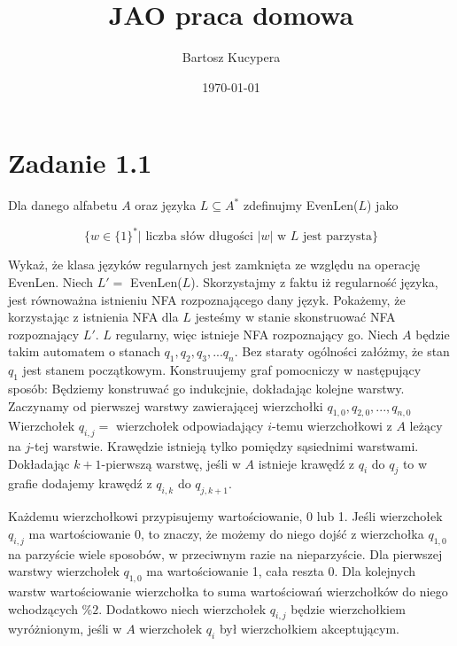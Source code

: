 \documentclass{article}
\title{JAO praca domowa}
\author{Bartosz Kucypera}
\date{\today}
\begin{document}
\maketitle

\section*{Zadanie 1.1}

Dla danego alfabetu $A$ oraz języka $L \subseteq A^*$ zdefinujmy EvenLen($L$) jako 

$$\{w \in \{1\}^* |\mbox{ liczba słów długości $|w|$ w $L$ jest parzysta} \}$$

Wykaż, że klasa języków regularnych jest zamknięta ze względu na operację EvenLen. \newline
\newline 
Niech $L' = $ EvenLen($L$).
Skorzystajmy z faktu iż regularność języka, jest równoważna istnieniu NFA rozpoznającego dany język. Pokażemy, że korzystając z istnienia NFA dla $L$ jesteśmy w stanie skonstruować NFA rozpoznający $L'$. \newline 
\newline 
$L$ regularny, więc istnieje NFA rozpoznający go. Niech $A$ będzie takim automatem o stanach $q_1, q_2, q_3, ... q_n$. Bez staraty ogólności załóżmy, że stan $q_1$ jest stanem początkowym. Konstruujemy graf pomocniczy w następujący sposób: \newline
Będziemy konstruwać go indukcjnie, dokładając kolejne warstwy.
Zaczynamy od pierwszej warstwy zawierającej wierzchołki $q_{1,0}, q_{2,0}, ..., q_{n,0}$
Wierzchołek $q_{i,j} = $ wierzchołek odpowiadający $i$-temu wierzchołkowi z $A$ leżący na $j$-tej warstwie. \newline 
Krawędzie istnieją tylko pomiędzy sąsiednimi warstwami. Dokładając $k+1$-pierwszą warstwę, jeśli w $A$ istnieje krawędź z $q_i$ do $q_j$ to w grafie dodajemy krawędź z $q_{i,k}$ do $q_{j,k+1}$.

Każdemu wierzchołkowi przypisujemy wartościowanie, 0 lub 1. Jeśli wierzchołek $q_{i, j}$ ma wartościowanie 0, to znaczy, że możemy do niego dojść z wierzchołka $q_{1, 0}$ na parzyście wiele sposobów, w przeciwnym razie na nieparzyście. \newline
Dla pierwszej warstwy wierzchołek $q_{1,0}$ ma wartościowanie 1, cała reszta 0. Dla kolejnych warstw wartościowanie wierzchołka to suma wartościowań wierzchołków do niego wchodzących $\%2$. \newline
Dodatkowo niech wierzchołek $q_{i,j}$ będzie wierzchołkiem wyróżnionym, jeśli w $A$ wierzchołek $q_i$ był wierzchołkiem akceptującym. \newline \newline
\end{document}
